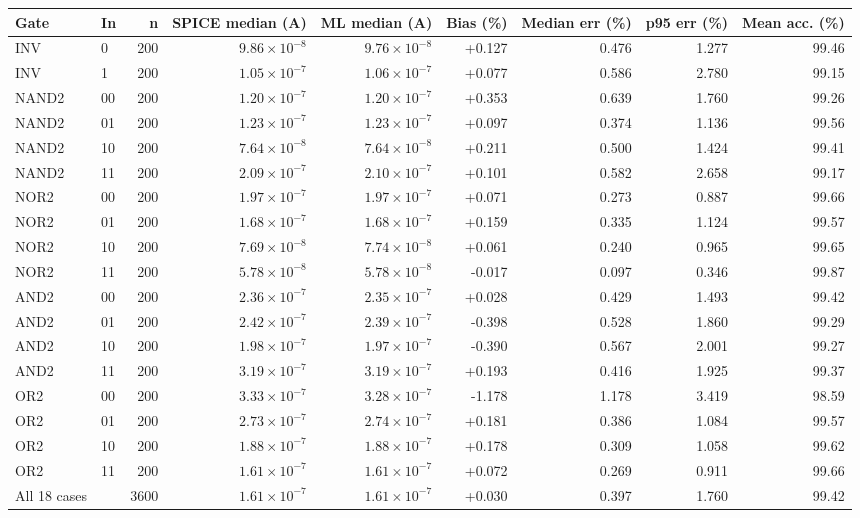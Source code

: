 \begin{tabular}{llrrrrrrr}
\hline
Gate & In & n & SPICE median (A) & ML median (A) & Bias (\%) & Median err (\%) & p95 err (\%) & Mean acc. (\%) \\
\hline
INV & 0 & 200 & $9.86\times10^{-8}$ & $9.76\times10^{-8}$ & +0.127 & 0.476 & 1.277 & 99.46 \\
INV & 1 & 200 & $1.05\times10^{-7}$ & $1.06\times10^{-7}$ & +0.077 & 0.586 & 2.780 & 99.15 \\
NAND2 & 00 & 200 & $1.20\times10^{-7}$ & $1.20\times10^{-7}$ & +0.353 & 0.639 & 1.760 & 99.26 \\
NAND2 & 01 & 200 & $1.23\times10^{-7}$ & $1.23\times10^{-7}$ & +0.097 & 0.374 & 1.136 & 99.56 \\
NAND2 & 10 & 200 & $7.64\times10^{-8}$ & $7.64\times10^{-8}$ & +0.211 & 0.500 & 1.424 & 99.41 \\
NAND2 & 11 & 200 & $2.09\times10^{-7}$ & $2.10\times10^{-7}$ & +0.101 & 0.582 & 2.658 & 99.17 \\
NOR2 & 00 & 200 & $1.97\times10^{-7}$ & $1.97\times10^{-7}$ & +0.071 & 0.273 & 0.887 & 99.66 \\
NOR2 & 01 & 200 & $1.68\times10^{-7}$ & $1.68\times10^{-7}$ & +0.159 & 0.335 & 1.124 & 99.57 \\
NOR2 & 10 & 200 & $7.69\times10^{-8}$ & $7.74\times10^{-8}$ & +0.061 & 0.240 & 0.965 & 99.65 \\
NOR2 & 11 & 200 & $5.78\times10^{-8}$ & $5.78\times10^{-8}$ & -0.017 & 0.097 & 0.346 & 99.87 \\
AND2 & 00 & 200 & $2.36\times10^{-7}$ & $2.35\times10^{-7}$ & +0.028 & 0.429 & 1.493 & 99.42 \\
AND2 & 01 & 200 & $2.42\times10^{-7}$ & $2.39\times10^{-7}$ & -0.398 & 0.528 & 1.860 & 99.29 \\
AND2 & 10 & 200 & $1.98\times10^{-7}$ & $1.97\times10^{-7}$ & -0.390 & 0.567 & 2.001 & 99.27 \\
AND2 & 11 & 200 & $3.19\times10^{-7}$ & $3.19\times10^{-7}$ & +0.193 & 0.416 & 1.925 & 99.37 \\
OR2 & 00 & 200 & $3.33\times10^{-7}$ & $3.28\times10^{-7}$ & -1.178 & 1.178 & 3.419 & 98.59 \\
OR2 & 01 & 200 & $2.73\times10^{-7}$ & $2.74\times10^{-7}$ & +0.181 & 0.386 & 1.084 & 99.57 \\
OR2 & 10 & 200 & $1.88\times10^{-7}$ & $1.88\times10^{-7}$ & +0.178 & 0.309 & 1.058 & 99.62 \\
OR2 & 11 & 200 & $1.61\times10^{-7}$ & $1.61\times10^{-7}$ & +0.072 & 0.269 & 0.911 & 99.66 \\
\hline
All 18 cases &  & 3600 & $1.61\times10^{-7}$ & $1.61\times10^{-7}$ & +0.030 & 0.397 & 1.760 & 99.42 \\
\hline
\end{tabular}
